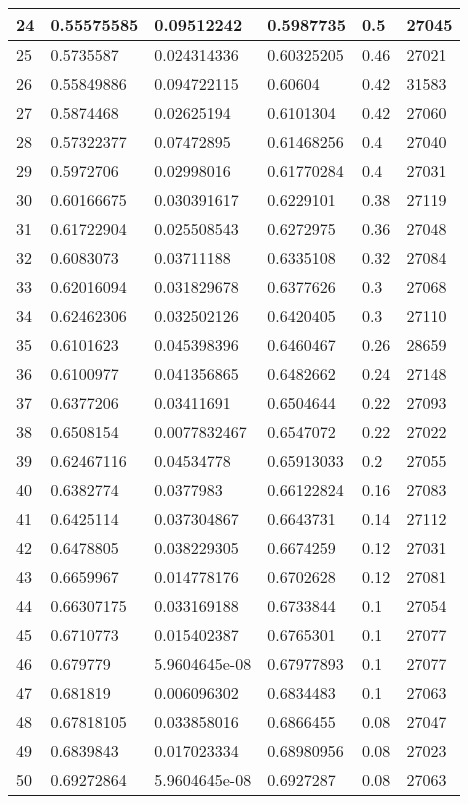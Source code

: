 \begin{longtable}{|l|l|l|l|l|l|}
24 & 0.55575585 & 0.09512242 & 0.5987735 & 0.5 & 27045 \\ \hline 
25 & 0.5735587 & 0.024314336 & 0.60325205 & 0.46 & 27021 \\ \hline 
26 & 0.55849886 & 0.094722115 & 0.60604 & 0.42 & 31583 \\ \hline 
27 & 0.5874468 & 0.02625194 & 0.6101304 & 0.42 & 27060 \\ \hline 
28 & 0.57322377 & 0.07472895 & 0.61468256 & 0.4 & 27040 \\ \hline 
29 & 0.5972706 & 0.02998016 & 0.61770284 & 0.4 & 27031 \\ \hline 
30 & 0.60166675 & 0.030391617 & 0.6229101 & 0.38 & 27119 \\ \hline 
31 & 0.61722904 & 0.025508543 & 0.6272975 & 0.36 & 27048 \\ \hline 
32 & 0.6083073 & 0.03711188 & 0.6335108 & 0.32 & 27084 \\ \hline 
33 & 0.62016094 & 0.031829678 & 0.6377626 & 0.3 & 27068 \\ \hline 
34 & 0.62462306 & 0.032502126 & 0.6420405 & 0.3 & 27110 \\ \hline 
35 & 0.6101623 & 0.045398396 & 0.6460467 & 0.26 & 28659 \\ \hline 
36 & 0.6100977 & 0.041356865 & 0.6482662 & 0.24 & 27148 \\ \hline 
37 & 0.6377206 & 0.03411691 & 0.6504644 & 0.22 & 27093 \\ \hline 
38 & 0.6508154 & 0.0077832467 & 0.6547072 & 0.22 & 27022 \\ \hline 
39 & 0.62467116 & 0.04534778 & 0.65913033 & 0.2 & 27055 \\ \hline 
40 & 0.6382774 & 0.0377983 & 0.66122824 & 0.16 & 27083 \\ \hline 
41 & 0.6425114 & 0.037304867 & 0.6643731 & 0.14 & 27112 \\ \hline 
42 & 0.6478805 & 0.038229305 & 0.6674259 & 0.12 & 27031 \\ \hline 
43 & 0.6659967 & 0.014778176 & 0.6702628 & 0.12 & 27081 \\ \hline 
44 & 0.66307175 & 0.033169188 & 0.6733844 & 0.1 & 27054 \\ \hline 
45 & 0.6710773 & 0.015402387 & 0.6765301 & 0.1 & 27077 \\ \hline 
46 & 0.679779 & 5.9604645e-08 & 0.67977893 & 0.1 & 27077 \\ \hline 
47 & 0.681819 & 0.006096302 & 0.6834483 & 0.1 & 27063 \\ \hline 
48 & 0.67818105 & 0.033858016 & 0.6866455 & 0.08 & 27047 \\ \hline 
49 & 0.6839843 & 0.017023334 & 0.68980956 & 0.08 & 27023 \\ \hline 
50 & 0.69272864 & 5.9604645e-08 & 0.6927287 & 0.08 & 27063 \\ \hline 
\end{longtable}